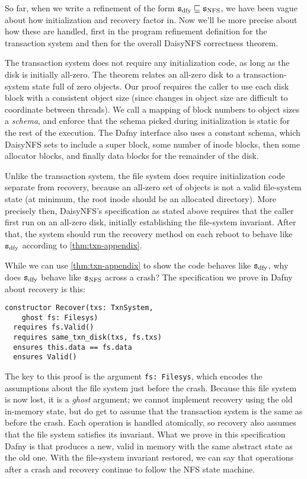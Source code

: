 So far, when we write a refinement of the form $\texttt{s}_{\mathrm{dfy}} \sqsubseteq \texttt{s}_{\mathrm{NFS}}$, we have
been vague about how initialization and recovery factor in. Now we'll
be more precise about how these are handled, first in the program refinement
definition for the transaction system and then for the overall DaisyNFS
correctness theorem.

The transaction system does not require any initialization code, as long as the
disk is initially all-zero. The theorem relates an all-zero disk to a
transaction-system state full of zero objects. Our proof requires the caller to
use each disk block with a consistent object size (since changes in object size
are difficult to coordinate between threads). We call a mapping of block numbers
to object sizes a \emph{schema}, and enforce that the schema picked during
initialization is static for the rest of the execution. The Dafny interface also
uses a constant schema, which DaisyNFS sets to include a super block, some
number of inode blocks, then some allocator blocks, and finally data blocks
for the remainder of the disk.

Unlike the transaction system, the file system does require initialization code
separate from recovery, because an all-zero set of objects is not a valid
file-system state (at minimum, the root inode should be an allocated directory).
More precisely then, DaisyNFS's specification as stated above requires that the
caller first run  on an all-zero disk, initially establishing the
file-system invariant. After that, the system should run the recovery method on
each reboot to behave like $\texttt{s}_{\mathrm{dfy}}$ according to \cref{thm:txn-appendix}.

While we can use \cref{thm:txn-appendix} to show the code behaves like $\texttt{s}_{\mathrm{dfy}}$, why
does $\texttt{s}_{\mathrm{dfy}}$ behave like $\texttt{s}_{\mathrm{NFS}}$ across a crash? The specification we prove in
Dafny about recovery is this:

\begin{verbatim}
constructor Recover(txs: TxnSystem,
    ghost fs: Filesys)
  requires fs.Valid()
  requires same_txn_disk(txs, fs.txs)
  ensures this.data == fs.data
  ensures Valid()
\end{verbatim}

The key to this proof is the argument \texttt{fs: Filesys}, which encodes the
assumptions about the file system just before the crash. Because this file
system is now lost, it is a \emph{ghost} argument; we cannot implement recovery
using the
old in-memory state, but do get to assume that the transaction system 
is the same as before the crash. Each operation is handled
atomically, so recovery also assumes that the file system satisfies its
 invariant. What we prove in this specification Dafny
is that  produces a new, valid  in memory with the
same abstract state as the old one. With the file-system invariant restored, we
can say that operations after a crash and recovery continue to follow the NFS
state machine.

